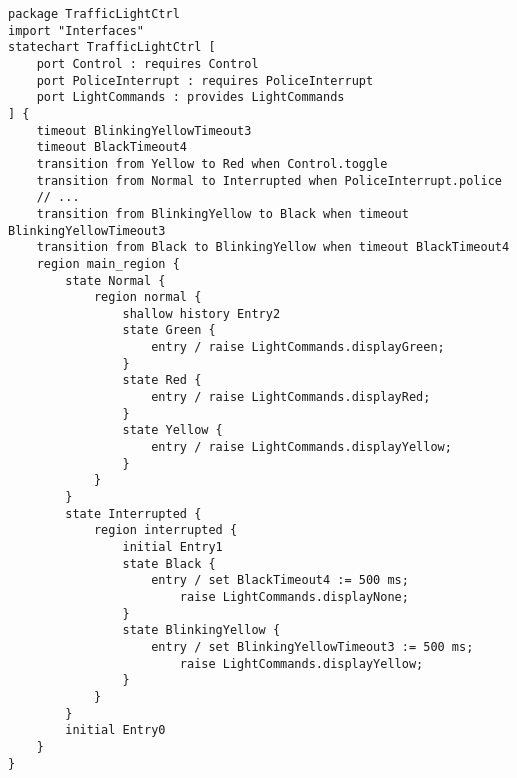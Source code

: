 \begin{lstlisting}[float,language=statechart, caption={The traffic light controller state machine in the Gamma textual representation.}, label={lst:gamma-statechart}]
package TrafficLightCtrl
import "Interfaces"
statechart TrafficLightCtrl [
	port Control : requires Control
	port PoliceInterrupt : requires PoliceInterrupt
	port LightCommands : provides LightCommands
] {
	timeout BlinkingYellowTimeout3
	timeout BlackTimeout4
	transition from Yellow to Red when Control.toggle
	transition from Normal to Interrupted when PoliceInterrupt.police
	// ...
	transition from BlinkingYellow to Black when timeout BlinkingYellowTimeout3
	transition from Black to BlinkingYellow when timeout BlackTimeout4
	region main_region {
		state Normal {
			region normal {
				shallow history Entry2
				state Green {
					entry / raise LightCommands.displayGreen;
				}
				state Red {
					entry / raise LightCommands.displayRed;
				}
				state Yellow {
					entry / raise LightCommands.displayYellow;
				}
			}
		}
		state Interrupted {
			region interrupted {
				initial Entry1
				state Black {
					entry / set BlackTimeout4 := 500 ms; 
						raise LightCommands.displayNone;
				}
				state BlinkingYellow {
					entry / set BlinkingYellowTimeout3 := 500 ms; 
						raise LightCommands.displayYellow;
				}
			}
		}
		initial Entry0
	}
}
\end{lstlisting}